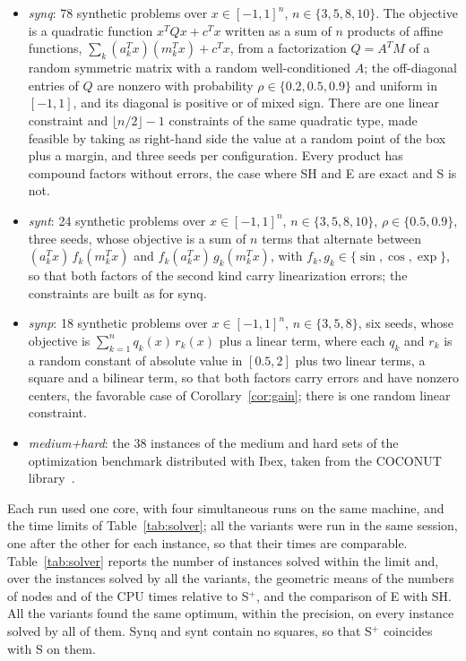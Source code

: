 \documentclass[10pt]{article}
\theoremstyle{definition}
\begin{document}
\begin{itemize}
\item \emph{synq}: 78 synthetic problems over $x\in[-1,1]^n$, $n\in\{3,5,8,10\}$. The objective is a quadratic function $x^TQx+c^Tx$ written as a sum of $n$ products of affine functions, $\sum_k(a_k^Tx)(m_k^Tx)+c^Tx$, from a factorization $Q=A^TM$ of a random symmetric matrix with a random well-conditioned $A$; the off-diagonal entries of $Q$ are nonzero with probability $\rho\in\{0.2,0.5,0.9\}$ and uniform in $[-1,1]$, and its diagonal is positive or of mixed sign. There are one linear constraint and $\lfloor n/2\rfloor-1$ constraints of the same quadratic type, made feasible by taking as right-hand side the value at a random point of the box plus a margin, and three seeds per configuration. Every product has compound factors without errors, the case where SH and E are exact and S is not.
\item \emph{synt}: 24 synthetic problems over $x\in[-1,1]^n$, $n\in\{3,5,8,10\}$, $\rho\in\{0.5,0.9\}$, three seeds, whose objective is a sum of $n$ terms that alternate between $(a_k^Tx)\,f_k(m_k^Tx)$ and $f_k(a_k^Tx)\,g_k(m_k^Tx)$, with $f_k,g_k\in\{\sin,\cos,\exp\}$, so that both factors of the second kind carry linearization errors; the constraints are built as for synq.
\item \emph{synp}: 18 synthetic problems over $x\in[-1,1]^n$, $n\in\{3,5,8\}$, six seeds, whose objective is $\sum_{k=1}^n q_k(x)\,r_k(x)$ plus a linear term, where each $q_k$ and $r_k$ is a random constant of absolute value in $[0.5,2]$ plus two linear terms, a square and a bilinear term, so that both factors carry errors and have nonzero centers, the favorable case of Corollary~\ref{cor:gain}; there is one random linear constraint.
\item \emph{medium+hard}: the 38 instances of the medium and hard sets of the optimization benchmark distributed with Ibex, taken from the COCONUT library~\cite{coconut}.
\end{itemize}
Each run used one core, with four simultaneous runs on the same machine, and the time limits of Table~\ref{tab:solver}; all the variants were run in the same session, one after the other for each instance, so that their times are comparable. Table~\ref{tab:solver} reports the number of instances solved within the limit and, over the instances solved by all the variants, the geometric means of the numbers of nodes and of the CPU times relative to S$^+$, and the comparison of E with SH. All the variants found the same optimum, within the precision, on every instance solved by all of them. Synq and synt contain no squares, so that S$^+$ coincides with S on them.
\end{document}
